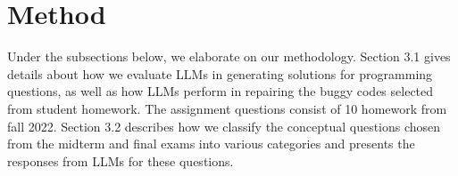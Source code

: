 \section{Method}








Under the subsections below, we elaborate on our methodology. Section 3.1 gives details about how we evaluate LLMs in generating solutions for programming questions, as well as how LLMs perform in repairing the buggy codes selected from student homework. The assignment questions consist of 10 homework from fall 2022. Section 3.2 describes how we classify the conceptual questions chosen from the midterm and final exams into various categories and presents the responses from LLMs for these questions.    


